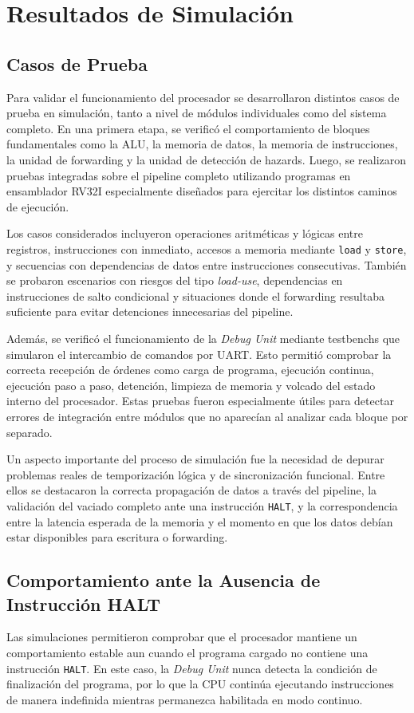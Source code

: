 \section{Resultados de Simulación}

\subsection{Casos de Prueba}
Para validar el funcionamiento del procesador se desarrollaron distintos casos de prueba en simulación, tanto a nivel de módulos individuales como del sistema completo. En una primera etapa, se verificó el comportamiento de bloques fundamentales como la ALU, la memoria de datos, la memoria de instrucciones, la unidad de forwarding y la unidad de detección de hazards. Luego, se realizaron pruebas integradas sobre el pipeline completo utilizando programas en ensamblador RV32I especialmente diseñados para ejercitar los distintos caminos de ejecución.

Los casos considerados incluyeron operaciones aritméticas y lógicas entre registros, instrucciones con inmediato, accesos a memoria mediante \texttt{load} y \texttt{store}, y secuencias con dependencias de datos entre instrucciones consecutivas. También se probaron escenarios con riesgos del tipo \textit{load-use}, dependencias en instrucciones de salto condicional y situaciones donde el forwarding resultaba suficiente para evitar detenciones innecesarias del pipeline.

Además, se verificó el funcionamiento de la \textit{Debug Unit} mediante testbenchs que simularon el intercambio de comandos por UART. Esto permitió comprobar la correcta recepción de órdenes como carga de programa, ejecución continua, ejecución paso a paso, detención, limpieza de memoria y volcado del estado interno del procesador. Estas pruebas fueron especialmente útiles para detectar errores de integración entre módulos que no aparecían al analizar cada bloque por separado.

Un aspecto importante del proceso de simulación fue la necesidad de depurar problemas reales de temporización lógica y de sincronización funcional. Entre ellos se destacaron la correcta propagación de datos a través del pipeline, la validación del vaciado completo ante una instrucción \texttt{HALT}, y la correspondencia entre la latencia esperada de la memoria y el momento en que los datos debían estar disponibles para escritura o forwarding.

\subsection{Comportamiento ante la Ausencia de Instrucción HALT}
Las simulaciones permitieron comprobar que el procesador mantiene un comportamiento estable aun cuando el programa cargado no contiene una instrucción \texttt{HALT}. En este caso, la \textit{Debug Unit} nunca detecta la condición de finalización del programa, por lo que la CPU continúa ejecutando instrucciones de manera indefinida mientras permanezca habilitada en modo continuo.

